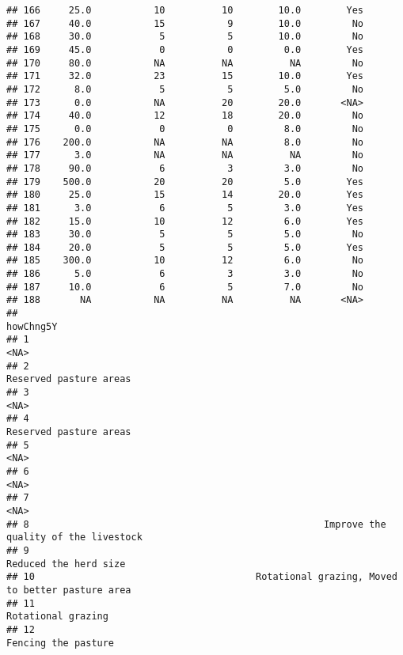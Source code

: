 \documentclass[
]{article}
\begin{document}
\begin{verbatim}
## 166     25.0           10          10        10.0        Yes
## 167     40.0           15           9        10.0         No
## 168     30.0            5           5        10.0         No
## 169     45.0            0           0         0.0        Yes
## 170     80.0           NA          NA          NA         No
## 171     32.0           23          15        10.0        Yes
## 172      8.0            5           5         5.0         No
## 173      0.0           NA          20        20.0       <NA>
## 174     40.0           12          18        20.0         No
## 175      0.0            0           0         8.0         No
## 176    200.0           NA          NA         8.0         No
## 177      3.0           NA          NA          NA         No
## 178     90.0            6           3         3.0         No
## 179    500.0           20          20         5.0        Yes
## 180     25.0           15          14        20.0        Yes
## 181      3.0            6           5         3.0        Yes
## 182     15.0           10          12         6.0        Yes
## 183     30.0            5           5         5.0         No
## 184     20.0            5           5         5.0        Yes
## 185    300.0           10          12         6.0         No
## 186      5.0            6           3         3.0         No
## 187     10.0            6           5         7.0         No
## 188       NA           NA          NA          NA       <NA>
##                                                                                 howChng5Y
## 1                                                                                    <NA>
## 2                                                                  Reserved pasture areas
## 3                                                                                    <NA>
## 4                                                                  Reserved pasture areas
## 5                                                                                    <NA>
## 6                                                                                    <NA>
## 7                                                                                    <NA>
## 8                                                    Improve the quality of the livestock
## 9                                                                   Reduced the herd size
## 10                                       Rotational grazing, Moved to better pasture area
## 11                                                                     Rotational grazing
## 12                                                                    Fencing the pasture

\end{verbatim}
\end{document}
